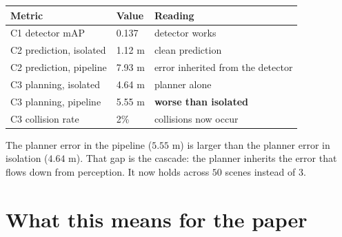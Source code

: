 \documentclass[11pt,a4paper]{article}
\begin{document}
\begin{table}[h!]
\centering
\renewcommand{\arraystretch}{1.3}
\begin{tabular}{@{}L{5.5cm}C{2.2cm}L{5.7cm}@{}}
\toprule
\textbf{Metric} & \textbf{Value} & \textbf{Reading} \\
\midrule
C1 detector mAP                 & 0.137 & detector works \\
C2 prediction, isolated         & 1.12 m & clean prediction \\
C2 prediction, pipeline         & 7.93 m & error inherited from the detector \\
C3 planning, isolated           & 4.64 m & planner alone \\
C3 planning, pipeline           & 5.55 m & \textbf{worse than isolated} \\
C3 collision rate               & 2\% & collisions now occur \\
\bottomrule
\end{tabular}
\end{table}

\noindent
The planner error in the pipeline ($5.55$ m) is larger than the planner error in
isolation ($4.64$ m). That gap is the cascade: the planner inherits the error
that flows down from perception. It now holds across $50$ scenes instead of $3$.

\section{What this means for the paper}
\end{document}
